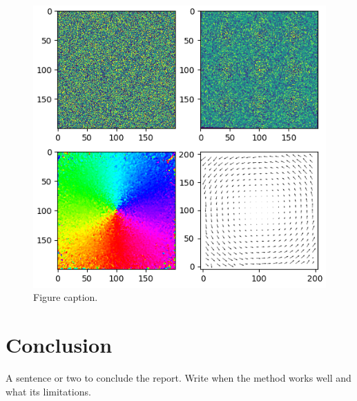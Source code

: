 \documentclass[9pt]{IEEEtran}
\begin{document}
\begin{figure}[h]
    \centering
    \includegraphics[width=1\columnwidth]{figure.png}
    \caption{Figure caption.}
    \label{fig:figure_label}
\end{figure}


\section{Conclusion}

A sentence or two to conclude the report. Write when the method works well and what its limitations.



\end{document}
